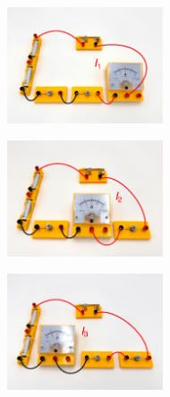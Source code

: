 \begin{figure}[h!]
\centering
    \begin{subfigure}[b]{0.305\textwidth}
    \centering
    \includegraphics[width=4.6cm]{_images/ampere_serie_1.pdf}
    \end{subfigure}
\quad
    \begin{subfigure}[b]{0.305\textwidth}
    \centering
    \includegraphics[width=4.6cm]{_images/ampere_serie_2.pdf}
    \end{subfigure}
\quad
    \begin{subfigure}[b]{0.305\textwidth}
    \centering
    \includegraphics[width=4.6cm]{_images/ampere_serie_3.pdf}
    \end{subfigure}
\end{figure}


